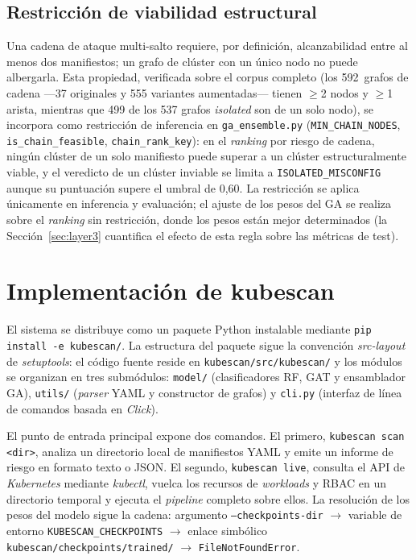 \subsection{Restricción de viabilidad estructural}
\label{sec:gate_estructural}

Una cadena de ataque multi-salto requiere, por definición, alcanzabilidad entre al
menos dos manifiestos; un grafo de clúster con un único nodo no puede albergarla.
Esta propiedad, verificada sobre el corpus completo (los 592~grafos de cadena
—37 originales y 555 variantes aumentadas— tienen \(\geq\)2 nodos y \(\geq\)1 arista,
mientras que 499 de los 537 grafos
\textit{isolated} son de un solo nodo), se incorpora como restricción de
inferencia en \texttt{ga\_ensemble.py} (\texttt{MIN\_CHAIN\_NODES},
\texttt{is\_chain\_feasible}, \texttt{chain\_rank\_key}): en el
\textit{ranking} por riesgo de cadena, ningún clúster de un solo manifiesto puede
superar a un clúster estructuralmente viable, y el veredicto de un clúster
inviable se limita a \texttt{ISOLATED\_MISCONFIG} aunque su puntuación supere el
umbral de 0,60. La restricción se aplica únicamente en inferencia y evaluación;
el ajuste de los pesos del \ac{GA} se realiza sobre el \textit{ranking} sin
restricción, donde los pesos están mejor determinados (la Sección~\ref{sec:layer3}
cuantifica el efecto de esta regla sobre las métricas de test).

\section{Implementación de kubescan}
\label{sec:implementacion}

El sistema se distribuye como un paquete Python instalable mediante
\texttt{pip install -e kubescan/}. La estructura del paquete sigue la convención
\textit{src-layout} de \textit{setuptools}: el código fuente reside en
\texttt{kubescan/src/kubescan/} y los módulos se organizan en tres submódulos:
\texttt{model/} (clasificadores \ac{RF}, \ac{GAT} y ensamblador \ac{GA}), \texttt{utils/}
(\textit{parser} \acs{YAML} y constructor de grafos) y \texttt{cli.py} (interfaz de
línea de comandos basada en \textit{Click}).

El punto de entrada principal expone dos comandos. El primero,
\texttt{kubescan scan <dir>}, analiza un directorio local de manifiestos \acs{YAML} y
emite un informe de riesgo en formato texto o \ac{JSON}. El segundo,
\texttt{kubescan live}, consulta el \ac{API} de \textit{Kubernetes} mediante
\textit{kubectl}, vuelca los recursos de \textit{workloads} y \ac{RBAC} en un directorio
temporal y ejecuta el \textit{pipeline} completo sobre ellos. La resolución de los
pesos del modelo sigue la cadena: argumento \texttt{--checkpoints-dir}
\(\to\) variable de entorno \texttt{KUBESCAN\_CHECKPOINTS} \(\to\) enlace simbólico
\texttt{kubescan/checkpoints/trained/} \(\to\) \texttt{FileNotFoundError}.

